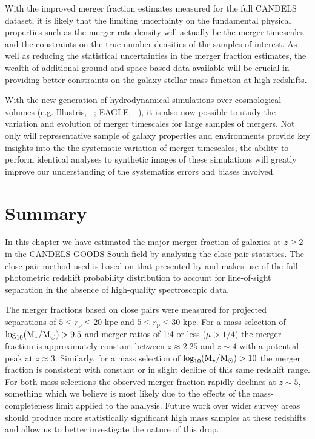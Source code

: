 With the improved merger fraction estimates measured for the full CANDELS dataset, it is likely that the limiting uncertainty on the fundamental physical properties such as the merger rate density will actually be the merger timescales and the constraints on the true number densities of the samples of interest. As well as reducing the statistical uncertainties in the merger fraction estimates, the wealth of additional ground and space-based data available will be crucial in providing better constraints on the galaxy stellar mass function at high redshifts. 

With the new generation of hydrodynamical simulations over cosmological volumes (e.g. Illustris, \citeauthor{Vogelsberger:2014gw}~\citeyear{Vogelsberger:2014gw}; EAGLE, \citeauthor{Schaye:2014gk}~\citeyear{Schaye:2014gk}), it is also now possible to study the variation and evolution of merger timescales for large samples of mergers. Not only will representative sample of galaxy properties and environments provide key insights into the the systematic variation of merger timescales, the ability to perform identical analyses to synthetic images of these simulations \citep{Torrey:2015kx} will greatly improve our understanding of the systematics errors and biases involved.

\section{Summary}\label{merger-sec:summary}
In this chapter we have estimated the major merger fraction of galaxies at $z\geq 2$ in the CANDELS GOODS South field \citep{Guo:2013ig} by analysing the close pair statistics. The close pair method used is based on that presented by \citet{LopezSanjuan:2014uj} and makes use of the full photometric redshift probability distribution to account for line-of-sight separation in the absence of high-quality spectroscopic data.

The merger fractions based on close pairs were measured for projected separations of $5 \leq r_{\text{p}} \leq 20$ kpc and $5 \leq r_{\text{p}} \leq 30$ kpc. For a mass selection of $\log_{10}(\text{M}_{\star} / \text{M}_{\odot}) > 9.5$ and merger ratios of 1:4 or less ($\mu > 1/4$) the merger fraction  is approximately constant between $z \approx 2.25$ and $z\sim4$ with a potential peak at $z\approx3$. Similarly, for a mass selection of $\log_{10}(\text{M}_{\star} / \text{M}_{\odot}) > 10$ the merger fraction is consistent with constant or in slight decline of this same redshift range. For both mass selections the observed merger fraction rapidly declines at $z\sim5$, something which we believe is most likely due to the effects of the mass-completeness limit applied to the analysis. Future work over wider survey areas should produce more statistically significant high mass samples at these redshifts and allow us to better investigate the nature of this drop.

